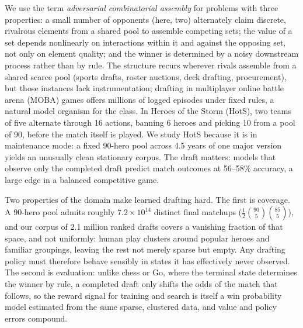 \documentclass[journal]{IEEEtran}
\begin{document}
We use the term \textit{adversarial combinatorial assembly} for problems with three properties: a small number of opponents (here, two) alternately claim discrete, rivalrous elements from a shared pool to assemble competing sets; the value of a set depends nonlinearly on interactions within it and against the opposing set, not only on element quality; and the winner is determined by a noisy downstream process rather than by rule. The structure recurs wherever rivals assemble from a shared scarce pool (sports drafts, roster auctions, deck drafting, procurement), but those instances lack instrumentation; drafting in multiplayer online battle arena (MOBA) games offers millions of logged episodes under fixed rules, a natural model organism for the class. In Heroes of the Storm (HotS), two teams of five alternate through 16 actions, banning 6 heroes and picking 10 from a pool of 90, before the match itself is played. We study HotS because it is in maintenance mode: a fixed 90-hero pool across 4.5 years of one major version yields an unusually clean stationary corpus. The draft matters: models that observe only the completed draft predict match outcomes at 56--58\% accuracy, a large edge in a balanced competitive game.

Two properties of the domain make learned drafting hard. The first is coverage. A 90-hero pool admits roughly $7.2 \times 10^{14}$ distinct final matchups ($\tfrac{1}{2}\binom{90}{5}\binom{85}{5}$), and our corpus of 2.1 million ranked drafts covers a vanishing fraction of that space, and not uniformly: human play clusters around popular heroes and familiar groupings, leaving the rest not merely sparse but empty. Any drafting policy must therefore behave sensibly in states it has effectively never observed. The second is evaluation: unlike chess or Go, where the terminal state determines the winner by rule, a completed draft only shifts the odds of the match that follows, so the reward signal for training and search is itself a win probability model estimated from the same sparse, clustered data, and value and policy errors compound.
\end{document}
